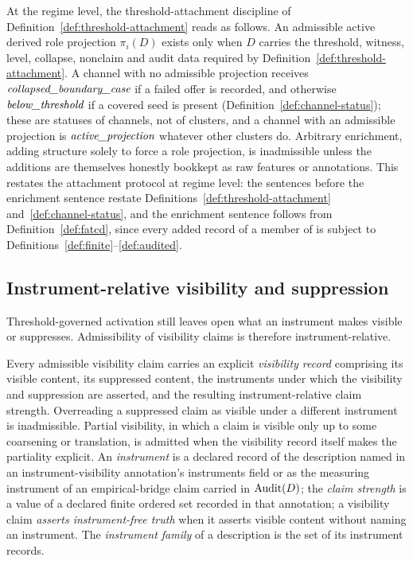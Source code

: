 \begin{remark}\label{prop:activation-thresholds}
At the regime level, the threshold-attachment discipline of
Definition~\ref{def:threshold-attachment} reads as follows. An
admissible active derived role projection \(\pi_i(D)\) exists only when
\(D\) carries the threshold, witness, level, collapse, nonclaim and audit data
required by Definition~\ref{def:threshold-attachment}. A channel with no
admissible projection receives \(\textit{collapsed\_\allowbreak boundary\_\allowbreak case}\) if a failed offer is
recorded, and otherwise \(\textit{below\_\allowbreak threshold}\) if a covered seed is present
(Definition~\ref{def:channel-status}); these are statuses of channels, not of
clusters, and a channel with an admissible projection is \(\textit{active\_\allowbreak projection}\)
whatever other clusters do. Arbitrary enrichment, adding structure
solely to force a role projection, is inadmissible unless the additions
are themselves honestly bookkept as raw features or annotations. This
restates the attachment protocol at regime level: the sentences before the
enrichment sentence restate Definitions~\ref{def:threshold-attachment}
and~\ref{def:channel-status}, and the enrichment sentence
follows from Definition~\ref{def:fatcd}, since every added record of a member of
\FATCD{} is subject to Definitions~\ref{def:finite}--\ref{def:audited}.
\end{remark}

\subsection{Instrument-relative visibility and suppression}\label{subsec:visibility-suppression}

Threshold-governed activation still leaves open what an instrument makes
visible or suppresses. Admissibility of visibility claims is therefore
instrument-relative.

\begin{definition}\label{prop:visibility}
Every admissible visibility claim carries an explicit \emph{visibility record}
comprising its visible content, its suppressed content, the instruments
under which the visibility and suppression are asserted, and the
resulting instrument-relative claim strength. Overreading a suppressed
claim as visible under a different instrument is inadmissible. Partial
visibility, in which a claim is visible only up to some coarsening or
translation, is admitted when the visibility record itself makes the
partiality explicit. An \emph{instrument} is a declared record of the
description named in an instrument-visibility annotation's instruments field
or as the measuring instrument of an empirical-bridge claim carried in
\(\operatorname{Audit}\!\left(D\right)\); the \emph{claim strength} is a value of a declared finite ordered
set recorded in that annotation; a visibility claim \emph{asserts
instrument-free truth} when it asserts visible content without naming an
instrument. The \emph{instrument family} of a description is the set of its
instrument records.
\end{definition}


